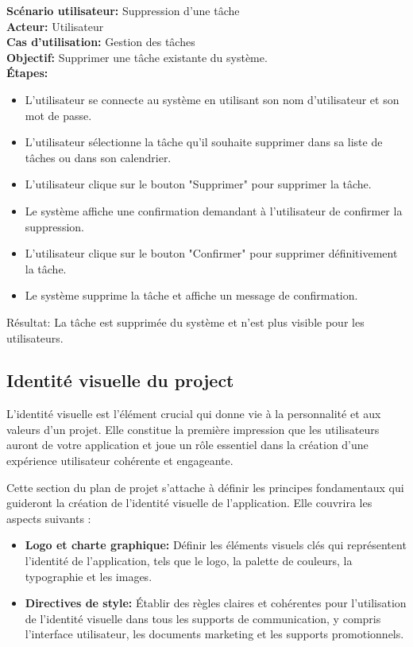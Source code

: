 \documentclass[a4paper,12pt]{report}
\begin{document}
\textbf{Scénario utilisateur:} Suppression d'une tâche\\
\textbf{Acteur:} Utilisateur\\
\textbf{Cas d'utilisation:} Gestion des tâches\\
\textbf{Objectif:} Supprimer une tâche existante du système.\\
\textbf{Étapes:}
\begin{itemize}
    \item L'utilisateur se connecte au système en utilisant son nom d'utilisateur et son mot de passe.
    \item L'utilisateur sélectionne la tâche qu'il souhaite supprimer dans sa liste de tâches ou dans son calendrier.
    \item L'utilisateur clique sur le bouton "Supprimer" pour supprimer la tâche.
    \item Le système affiche une confirmation demandant à l'utilisateur de confirmer la suppression.
    \item L'utilisateur clique sur le bouton "Confirmer" pour supprimer définitivement la tâche.
    \item Le système supprime la tâche et affiche un message de confirmation.
\end{itemize}
Résultat:
    La tâche est supprimée du système et n'est plus visible pour les utilisateurs.

\subsection{Identité visuelle du project}
L'identité visuelle est l'élément crucial qui donne vie à la personnalité et aux valeurs d'un projet. Elle constitue la première impression que les utilisateurs auront de votre application et joue un rôle essentiel dans la création d'une expérience utilisateur cohérente et engageante.

Cette section du plan de projet s'attache à définir les principes fondamentaux qui guideront la création de l'identité visuelle de l'application. Elle couvrira les aspects suivants :

\begin{itemize}
  \item \textbf{Logo et charte graphique:} Définir les éléments visuels clés qui représentent l'identité de l'application, tels que le logo, la palette de couleurs, la typographie et les images.
  
  \item \textbf {Directives de style:} Établir des règles claires et cohérentes pour l'utilisation de l'identité visuelle dans tous les supports de communication, y compris l'interface utilisateur, les documents marketing et les supports promotionnels.
\end{itemize}
\end{document}

